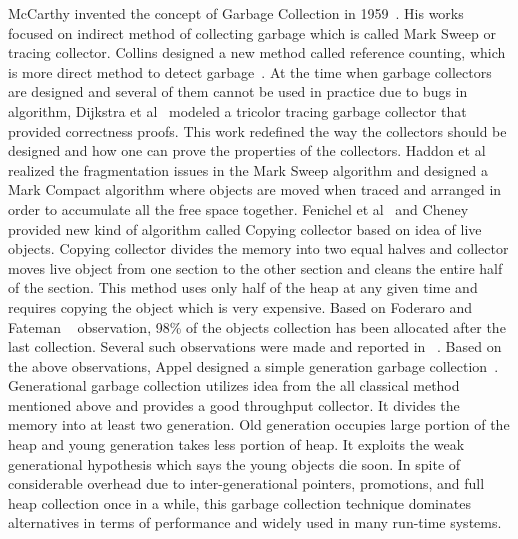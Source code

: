 McCarthy invented the concept of Garbage Collection in 1959~\cite{mccarthy}. His works focused on indirect method of collecting 
garbage which is called Mark Sweep or tracing collector. Collins designed a new method called reference counting, which is more direct method to detect garbage~\cite{Collins1960}. 
At the time when garbage collectors are designed and several of them cannot be used in practice due to bugs in algorithm, Dijkstra et al~\cite{dijkstra} modeled a tricolor tracing garbage collector that provided correctness proofs. This work redefined the 
way the collectors should be designed and how one can prove the properties of the collectors. Haddon et al ~\cite{haddon} realized 
the fragmentation issues in the Mark Sweep algorithm and designed a Mark Compact algorithm where objects are moved when traced and arranged in order to accumulate all the free space together. Fenichel et al~\cite{feni} and Cheney~\cite{cheney}
provided new kind of algorithm called Copying collector based on idea of live objects. Copying collector divides the memory into two equal halves and collector moves live object from one section to the other section and cleans the entire half of the section. This method uses only half of the heap at any given time and requires copying the object which is very expensive. Based on Foderaro and Fateman ~\cite{fode81} observation,  98\% of the objects collection has been allocated after the last collection. Several such observations were made and reported in ~\cite{zorn89,sans93}. Based on the above observations, Appel  designed a simple generation garbage collection~\cite{Appel89}. Generational garbage collection utilizes idea from the all classical method mentioned above and provides a good throughput collector. It divides the memory into at least two generation. Old generation occupies large portion of the heap and young generation takes less portion of heap. It exploits the weak generational hypothesis which says the young objects die soon. In spite of considerable overhead due to inter-generational pointers, promotions, and full heap collection once in a while, this garbage collection technique dominates alternatives in terms of performance and widely used in many run-time systems.

